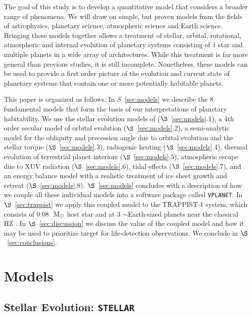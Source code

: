 \documentclass[preprint,12pt]{aastex}
\def\msun{{\rm\,M_\odot}}
\def\vplanet{\texttt{VPLANET}}
\def\stellar{\texttt{STELLAR}}
\begin{document}
The goal of this study is to develop a quantitative model that
considers a broader range of phenomena. We will draw on simple, but
proven models from the fields of astrophysics, planetary science,
atmospheric science and Earth science. Bringing these models together
allows a treatment of stellar, orbital, rotational, atmospheric and
internal evolution of planetary systems consisting of 1 star and
multiple planets in a wide array of architectures. While this
treatment is far more general than previous studies, it is still
incomplete. Nonetheless, these models can be used to provide a first
order picture of the evolution and current state of planetary systems
that contain one or more potentially habitable planets.

This paper is organized as follows. In $S$~\ref{sec:models} we
describe the 8 fundamental models that form the basis of our
interpretations of planetary habitability. We use the stellar
evolution models of \citep{Baraffe15} ($\S$~\ref{sec:models}.1), a 4th
order secular model of orbital evolution ($\S$~\ref{sec:models}.2), a
semi-analytic model for the obliquity and precession angle due to
orbital evolution and the stellar torque ($\S$~\ref{sec:models}.3),
radiogenic heating ($\S$~\ref{sec:models}.4), thermal evolution of
terrestrial planet interiors ($\S$~\ref{sec:models}.5), atmospheric
escape due to XUV radiation ($\S$~\ref{sec:models}.6), tidal effects
($\S$~\ref{sec:models}.7), and an energy balance model with a
realistic treatment of ice sheet growth and retreat
($\S$~\ref{sec:models}.8). $\S$~\ref{sec:models} concludes with a
description of how we couple all these individual models into a
software package called \vplanet. In $\S$~\ref{sec:trappist} we apply
this coupled model to the TRAPPIST-1 system, which consists of
0.08~$\msun$ host star and at 3 $\sim$Earth-sized planets near the
classical HZ \citep{Gillon16}. In $\S$~\ref{sec:discussion} we discuss
the value of the coupled model and how it may be used to prioritize
target for life-detection observations. We conclude in
$\S$~\ref{sec:conclusions}.

\section{Models\label{sec:models}}

\subsection{Stellar Evolution: \stellar}
\end{document}
